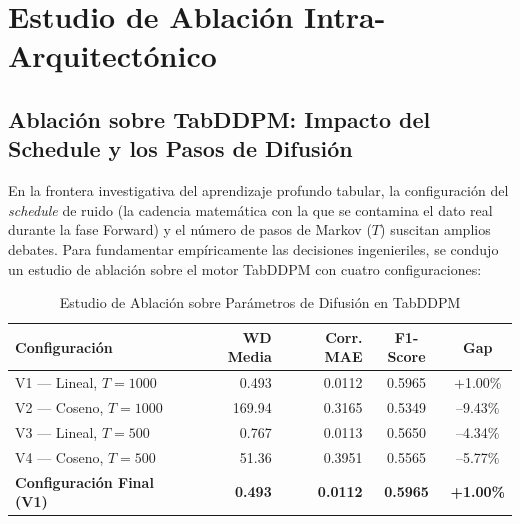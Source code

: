 \section{Estudio de Ablación Intra-Arquitectónico}

\subsection{Ablación sobre TabDDPM: Impacto del Schedule y los Pasos de Difusión}

En la frontera investigativa del aprendizaje profundo tabular, la configuración del \textit{schedule} de ruido (la cadencia matemática con la que se contamina el dato real durante la fase Forward) y el número de pasos de Markov ($T$) suscitan amplios debates. Para fundamentar empíricamente las decisiones ingenieriles, se condujo un estudio de ablación sobre el motor TabDDPM con cuatro configuraciones:

\begin{table}[htbp]
\centering
\caption{Estudio de Ablación sobre Parámetros de Difusión en TabDDPM}
\label{tab:ablation_tabddpm}
\begin{tabularx}{\textwidth}{>{\raggedright\arraybackslash}X r r c c}
\toprule
\textbf{Configuración} & \textbf{WD Media} & \textbf{Corr. MAE} & \textbf{F1-Score} & \textbf{Gap} \\
\midrule
\rowcolor{gray!10} V1 --- Lineal, $T=1000$ & 0.493 & 0.0112 & 0.5965 & +1.00\% \\
V2 --- Coseno, $T=1000$ & 169.94 & 0.3165 & 0.5349 & --9.43\% \\
\rowcolor{gray!10} V3 --- Lineal, $T=500$ & 0.767 & 0.0113 & 0.5650 & --4.34\% \\
V4 --- Coseno, $T=500$ & 51.36 & 0.3951 & 0.5565 & --5.77\% \\
\midrule
\rowcolor{uaxblue!10} \textbf{Configuración Final (V1)} & \textbf{0.493} & \textbf{0.0112} & \textbf{0.5965} & \textbf{+1.00\%} \\
\bottomrule
\end{tabularx}
\end{table}

